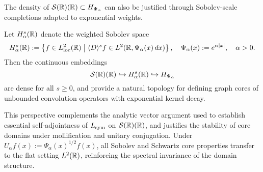 \begin{remark}
\label{rem:sobolev_core_reference}
The density of \( \mathcal{S}(\mathbb{R})(\mathbb{R}) \subset H_{\Psi_\alpha} \) can also be justified through Sobolev-scale completions adapted to exponential weights.

\medskip

Let \( H^s_\alpha(\mathbb{R}) \) denote the weighted Sobolev space
\[
H^s_\alpha(\mathbb{R}) := \left\{ f \in L^2_{\mathrm{loc}}(\mathbb{R}) \;\middle|\; \langle D \rangle^s f \in L^2(\mathbb{R}, \Psi_\alpha(x)\, dx) \right\}, \quad \Psi_\alpha(x) := e^{\alpha |x|}, \quad \alpha > 0.
\]
Then the continuous embeddings
\[
\mathcal{S}(\mathbb{R})(\mathbb{R}) \hookrightarrow H^s_\alpha(\mathbb{R}) \hookrightarrow H_{\Psi_\alpha}
\]
are dense for all \( s \ge 0 \), and provide a natural topology for defining graph cores of unbounded convolution operators with exponential kernel decay.

\medskip

This perspective complements the analytic vector argument used to establish essential self-adjointness of \( L_{\mathrm{sym}} \) on \( \mathcal{S}(\mathbb{R})(\mathbb{R}) \), and justifies the stability of core domains under mollification and unitary conjugation. Under \( U_\alpha f(x) := \Psi_\alpha(x)^{1/2} f(x) \), all Sobolev and Schwartz core properties transfer to the flat setting \( L^2(\mathbb{R}) \), reinforcing the spectral invariance of the domain structure.
\end{remark}
